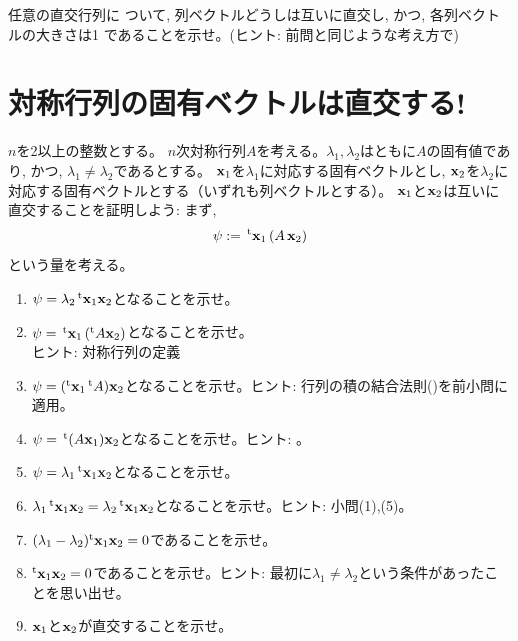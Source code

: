 \begin{q}
\begin{q}\label{q:orthonorm_vec_ortogonal_matrix2} 任意の直交行列に
ついて, 列ベクトルどうしは互いに直交し, かつ, 各列ベクトルの大きさは1
であることを示せ。(ヒント: 前問と同じような考え方で)
\end{q}
\mv
\mv

\section{対称行列の固有ベクトルは直交する!}
\begin{q}\label{q:symmmetry_matrix_eigenvec_ort} $n$を2以上の整数とする。
$n$次対称行列$A$を考える。$\lambda_1, \lambda_2$はともに$A$の固有値であり, 
かつ, $\lambda_1\neq\lambda_2$であるとする。
${\bf x}_1$を$\lambda_1$に対応する固有ベクトルとし, ${\bf x}_2$を$\lambda_2$に
対応する固有ベクトルとする（いずれも列ベクトルとする）。
${\bf x}_1$と${\bf x}_2$は互いに直交することを証明しよう: 
まず, 
\begin{eqnarray}
\psi:=\,^{\text t}{\bf x}_1\,(A\,{\bf x}_2)
\end{eqnarray}
という量を考える。
\begin{enumerate}
\item $\psi=\lambda_2\,^{\text t}{\bf x}_1{\bf x}_2$となることを示せ。
\item $\psi=\,^{\text t}{\bf x}_1\,(^{\text t}A{\bf x}_2)$となることを示せ。\\ヒント: 対称行列の定義
\item $\psi=(^{\text t}{\bf x}_1\,^{\text t}A){\bf x}_2$となることを示せ。ヒント: 行列の積の結合法則()を前小問に適用。
\item $\psi=\,^{\text t}(A{\bf x}_1){\bf x}_2$となることを示せ。ヒント: 。
\item $\psi=\lambda_1\,^{\text t}{\bf x}_1{\bf x}_2$となることを示せ。
\item $\lambda_1\,^{\text t}{\bf x}_1{\bf x}_2=\lambda_2\,^{\text t}{\bf x}_1{\bf x}_2$となることを示せ。ヒント: 小問(1),(5)。
\item $(\lambda_1-\lambda_2)^{\text t}{\bf x}_1{\bf x}_2=0$であることを示せ。
\item $^{\text t}{\bf x}_1{\bf x}_2=0$であることを示せ。ヒント: 最初に$\lambda_1\neq\lambda_2$という条件があったことを思い出せ。
\item ${\bf x}_1$と${\bf x}_2$が直交することを示せ。
\end{enumerate}\end{q}
\mv


\end{q}

